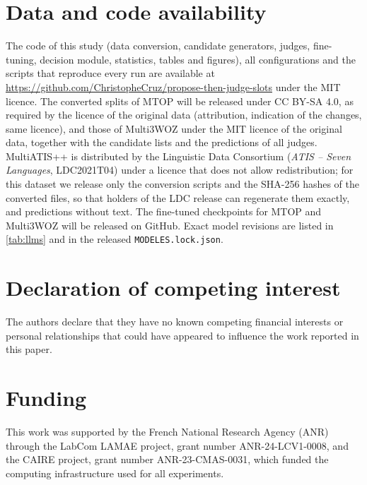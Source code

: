 
\section*{Data and code availability}
\label{sec:data-availability}

The code of this study (data conversion, candidate generators, judges, fine-tuning, decision module, statistics, tables and figures), all configurations and the scripts that reproduce every run are available at \url{https://github.com/ChristopheCruz/propose-then-judge-slots} under the MIT licence. The converted splits of MTOP \citep{li2021mtop} will be released under CC BY-SA 4.0, as required by the licence of the original data (attribution, indication of the changes, same licence), and those of Multi3WOZ \citep{hu2023multi3woz} under the MIT licence of the original data, together with the candidate lists and the predictions of all judges. MultiATIS++ is distributed by the Linguistic Data Consortium (\emph{ATIS -- Seven Languages}, LDC2021T04) \citep{mansour2021atis7} under a licence that does not allow redistribution; for this dataset we release only the conversion scripts and the SHA-256 hashes of the converted files, so that holders of the LDC release can regenerate them exactly, and predictions without text. The fine-tuned checkpoints for MTOP and Multi3WOZ will be released on GitHub. Exact model revisions are listed in \cref{tab:llms} and in the released \texttt{MODELES.lock.json}.

\section*{Declaration of competing interest}

The authors declare that they have no known competing financial interests or personal relationships that could have appeared to influence the work reported in this paper.


\section*{Funding}

This work was supported by the French National Research Agency (ANR) through the LabCom LAMAE project, grant number ANR-24-LCV1-0008, and the CAIRE project, grant number ANR-23-CMAS-0031, which funded the computing infrastructure used for all experiments.

